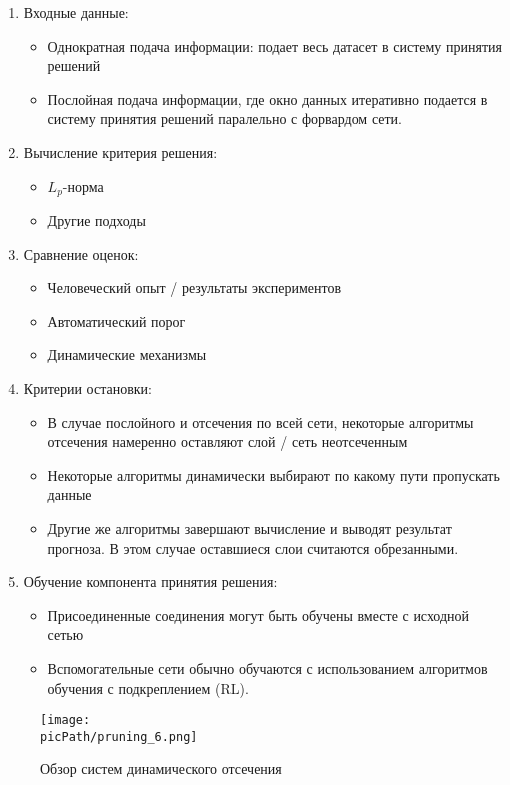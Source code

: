 \documentclass[oneside,final,12pt]{extreport}
\newcommand{\picPath}{images}
\begin{document}
\begin{enumerate}
\item Входные данные:
 \begin{itemize}
\item Однократная подача информации: подает весь датасет в систему принятия решений
\item Послойная подача информации, где окно данных итеративно подается в систему принятия решений паралельно с форвардом сети.
\end{itemize}
\item	Вычисление критерия решения:
\begin{itemize}
\item	$L_p$-норма
\item	Другие подходы
\end{itemize}
\item Сравнение оценок:
\begin{itemize}
\item	Человеческий опыт / результаты экспериментов
\item	Автоматический порог
\item	Динамические механизмы
\end{itemize}
\item Критерии остановки:
\begin{itemize}
\item	В случае послойного и отсечения по всей сети, некоторые алгоритмы отсечения намеренно оставляют слой / сеть неотсеченным
\item	Некоторые алгоритмы динамически выбирают по какому пути пропускать данные
\item	Другие же алгоритмы завершают вычисление и выводят результат прогноза. В этом случае оставшиеся слои считаются обрезанными.
\end{itemize}
\item Обучение компонента принятия решения:
\begin{itemize}
\item	Присоединенные соединения могут быть обучены вместе с исходной сетью 
\item	Вспомогательные сети обычно обучаются с использованием алгоритмов обучения с подкреплением (RL).
\end{itemize}
\end{enumerate}
\begin{figure}[H]
\begin{center}
  \texttt{[image: \\picPath/pruning\_6.png]}
  \caption{Обзор систем динамического отсечения}
  \label{fig:pruning_7}
  \end{center}
\end{figure}
\end{document}
